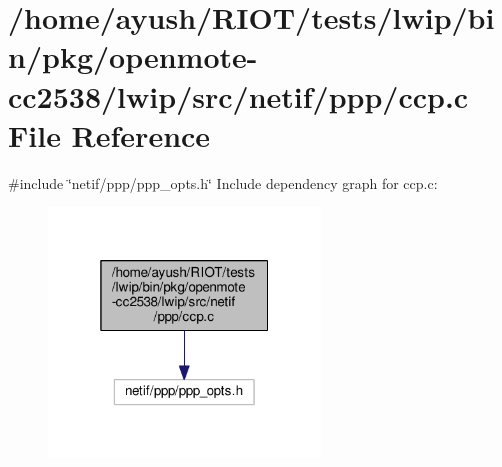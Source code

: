 \hypertarget{openmote-cc2538_2lwip_2src_2netif_2ppp_2ccp_8c}{}\section{/home/ayush/\+R\+I\+O\+T/tests/lwip/bin/pkg/openmote-\/cc2538/lwip/src/netif/ppp/ccp.c File Reference}
\label{openmote-cc2538_2lwip_2src_2netif_2ppp_2ccp_8c}
{\ttfamily \#include \char`\"{}netif/ppp/ppp\+\_\+opts.\+h\char`\"{}}\newline
Include dependency graph for ccp.\+c\+:
\nopagebreak
\begin{figure}[H]
\begin{center}
\leavevmode
\includegraphics[width=205pt]{openmote-cc2538_2lwip_2src_2netif_2ppp_2ccp_8c__incl}
\end{center}
\end{figure}
